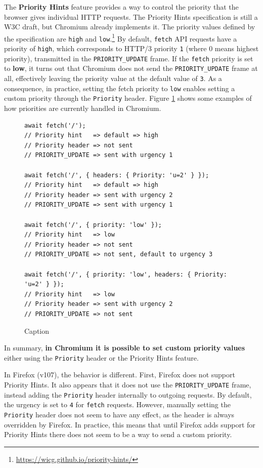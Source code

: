 The \textbf{Priority Hints} feature provides a way to control the priority that the browser gives individual HTTP requests. The Priority Hints specification is still a W3C draft, but Chromium already implements it. The priority values defined by the specification are \texttt{high} and \texttt{low}.\footnote{\url{https://wicg.github.io/priority-hints/}} By default, \texttt{fetch} API requests have a priority of \texttt{high}, which corresponds to HTTP/3 priority \texttt{1} (where 0 means highest priority), transmitted in the \texttt{PRIORITY\_UPDATE} frame. If the \texttt{fetch} priority is set to \textbf{low}, it turns out that Chromium does not send the \texttt{PRIORITY\_UPDATE} frame at all, effectively leaving the priority value at the default value of \texttt{3}. As a consequence, in practice, setting the fetch priority to \texttt{low} enables setting a custom priority through the \texttt{Priority} header. Figure \ref{fig:chromium_fetch} shows some examples of how priorities are currently handled in Chromium.

\begin{figure}[h]
    \centering
    \begin{verbatim}
await fetch('/');
// Priority hint   => default => high
// Priority header => not sent
// PRIORITY_UPDATE => sent with urgency 1

await fetch('/', { headers: { Priority: 'u=2' } });
// Priority hint   => default => high
// Priority header => sent with urgency 2
// PRIORITY_UPDATE => sent with urgency 1

await fetch('/', { priority: 'low' });
// Priority hint   => low
// Priority header => not sent
// PRIORITY_UPDATE => not sent, default to urgency 3

await fetch('/', { priority: 'low', headers: { Priority: 'u=2' } });
// Priority hint   => low
// Priority header => sent with urgency 2
// PRIORITY_UPDATE => not sent
    \end{verbatim}
    \caption{Caption}
    \label{fig:chromium_fetch}
\end{figure}

In summary, \textbf{in Chromium it is possible to set custom priority values} either using the \texttt{Priority} header or the Priority Hints feature.

In Firefox (v107), the behavior is different. First, Firefox does not support Priority Hints. It also appears that it does not use the \texttt{PRIORITY\_UPDATE} frame, instead adding the \texttt{Priority} header internally to outgoing requests. By default, the urgency is set to \texttt{4} for \texttt{fetch} requests. However, manually setting the \texttt{Priority} header does not seem to have any effect, as the header is always overridden by Firefox. In practice, this means that until Firefox adds support for Priority Hints there does not seem to be a way to send a custom priority.

